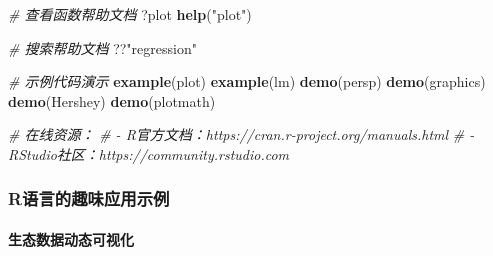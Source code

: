 \documentclass[
]{book}
\newenvironment{Shaded}{\begin{snugshade}}{\end{snugshade}}
\newcommand{\CommentTok}[1]{\textcolor[rgb]{0.56,0.35,0.01}{\textit{#1}}}
\newcommand{\FunctionTok}[1]{\textcolor[rgb]{0.13,0.29,0.53}{\textbf{#1}}}
\newcommand{\NormalTok}[1]{#1}
\newcommand{\StringTok}[1]{\textcolor[rgb]{0.31,0.60,0.02}{#1}}
\begin{document}
\begin{Shaded}
\begin{Highlighting}[]
\CommentTok{\# 查看函数帮助文档}
\NormalTok{?plot}
\FunctionTok{help}\NormalTok{(}\StringTok{"plot"}\NormalTok{)}

\CommentTok{\# 搜索帮助文档}
\NormalTok{??}\StringTok{"regression"}

\CommentTok{\# 示例代码演示}
\FunctionTok{example}\NormalTok{(plot)}
\FunctionTok{example}\NormalTok{(lm)}
\FunctionTok{demo}\NormalTok{(persp)}
\FunctionTok{demo}\NormalTok{(graphics)}
\FunctionTok{demo}\NormalTok{(Hershey)}
\FunctionTok{demo}\NormalTok{(plotmath)}


\CommentTok{\# 在线资源：}
\CommentTok{\# {-} R官方文档：https://cran.r{-}project.org/manuals.html}
\CommentTok{\# {-} RStudio社区：https://community.rstudio.com}
\end{Highlighting}
\end{Shaded}

\hypertarget{rux8bedux8a00ux7684ux8da3ux5473ux5e94ux7528ux793aux4f8b}{%
\subsubsection{R语言的趣味应用示例}\label{rux8bedux8a00ux7684ux8da3ux5473ux5e94ux7528ux793aux4f8b}}

\hypertarget{ux751fux6001ux6570ux636eux52a8ux6001ux53efux89c6ux5316}{%
\paragraph{生态数据动态可视化}\label{ux751fux6001ux6570ux636eux52a8ux6001ux53efux89c6ux5316}}
\end{document}
